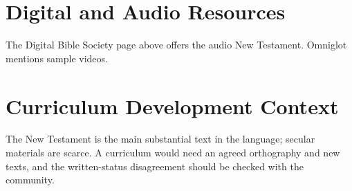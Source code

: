 \documentclass[12pt]{article}
\begin{document}
\section{Digital and Audio Resources}
The Digital Bible Society page above offers the audio New Testament. Omniglot mentions sample videos.

\section{Curriculum Development Context}
The New Testament is the main substantial text in the language; secular materials are scarce. A curriculum would need an agreed orthography and new texts, and the written-status disagreement should be checked with the community.
\end{document}
